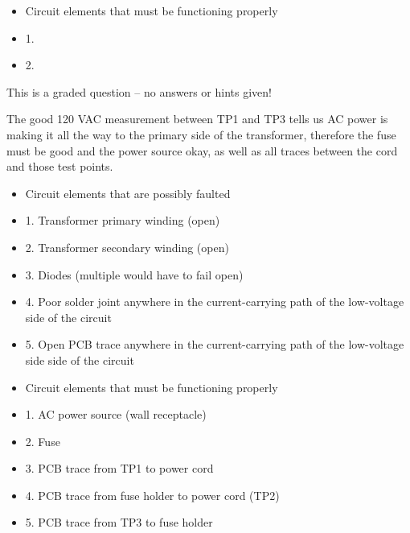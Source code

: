 \begin{itemize}
\goodbreak
\item{} Circuit elements that must be functioning properly
\item{1.} 
\item{2.} 
\end{itemize}

\vfil 

\eject






This is a graded question -- no answers or hints given!







The good 120 VAC measurement between TP1 and TP3 tells us AC power is making it all the way to the primary side of the transformer, therefore the fuse must be good and the power source okay, as well as all traces between the cord and those test points.

\vskip 10pt

\begin{itemize}
\goodbreak
\item{} Circuit elements that are possibly faulted
\item{1.} Transformer primary winding (open)
\item{2.} Transformer secondary winding (open)
\item{3.} Diodes (multiple would have to fail open)
\item{4.} Poor solder joint anywhere in the current-carrying path of the low-voltage side of the circuit
\item{5.} Open PCB trace anywhere in the current-carrying path of the low-voltage side side of the circuit
\end{itemize}

\begin{itemize}
\goodbreak
\item{} Circuit elements that must be functioning properly
\item{1.} AC power source (wall receptacle)
\item{2.} Fuse
\item{3.} PCB trace from TP1 to power cord
\item{4.} PCB trace from fuse holder to power cord (TP2)
\item{5.} PCB trace from TP3 to fuse holder
\end{itemize}





